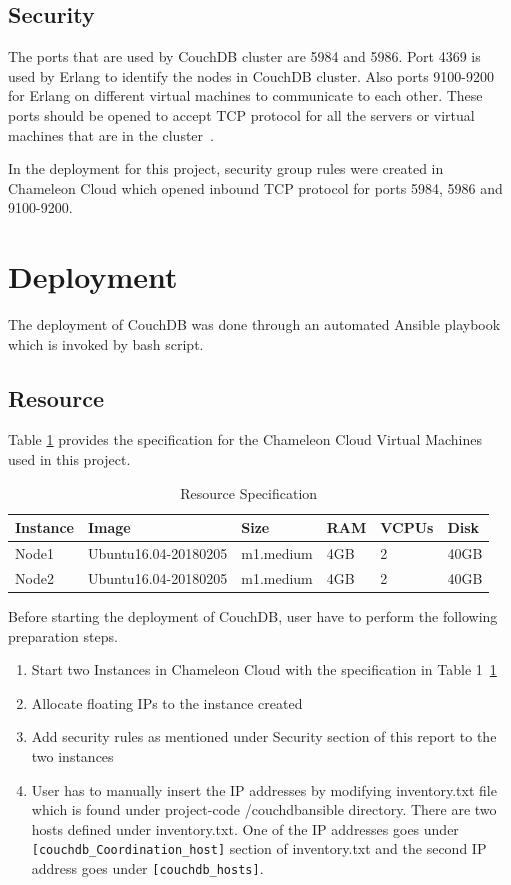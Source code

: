 \subsection{Security}
The ports that are used by CouchDB cluster are 5984 and 5986. Port
4369 is used by Erlang to identify the nodes in CouchDB cluster. Also
ports 9100-9200 for Erlang on different virtual machines to communicate to each
other. These ports should be opened to accept TCP protocol for all the
servers or virtual machines that are in the
cluster~\cite{www-CouchdbSetup}. 

In the deployment for this project, security group rules were
created in Chameleon Cloud which opened inbound TCP protocol for ports
5984, 5986 and 9100-9200.


\section{Deployment}
The deployment of CouchDB  was done through an automated Ansible
playbook which is invoked by bash script.
\subsection{Resource}
Table \ref{t:resource-specification} provides the specification for
the Chameleon Cloud Virtual Machines used in this project.

\begin{table}[]
\centering
\caption{Resource Specification}
\label{t:resource-specification}
\begin{tabular}{|l|l|l|l|l|l|}
\hline
\textbf{Instance} & \textbf{Image}       & \textbf{Size} & \textbf{RAM} & \textbf{VCPUs} & \textbf{Disk} \\ \hline
Node1             & Ubuntu16.04-20180205 & m1.medium     & 4GB          & 2              & 40GB          \\ \hline
Node2             & Ubuntu16.04-20180205 & m1.medium     & 4GB          & 2              & 40GB          \\ \hline
\end{tabular}
\end{table}

Before starting the deployment of CouchDB, user have to perform the
following preparation steps.
\begin{enumerate}
  \item Start two Instances in Chameleon Cloud with the specification
    in Table 1~\ref{t:resource-specification}
   \item  Allocate floating IPs to the instance created
    \item Add  security rules as mentioned under Security section
      of this report to the two instances 
    \item  User has to manually insert the IP addresses by modifying
      inventory.txt file which is found under project-code
      /couchdbansible directory. There are two hosts 
      defined under inventory.txt. One of the IP addresses
      goes under \verb|[couchdb_Coordination_host]| section of inventory.txt
      and the second IP address goes under \verb|[couchdb_hosts]|.
\end{enumerate}

